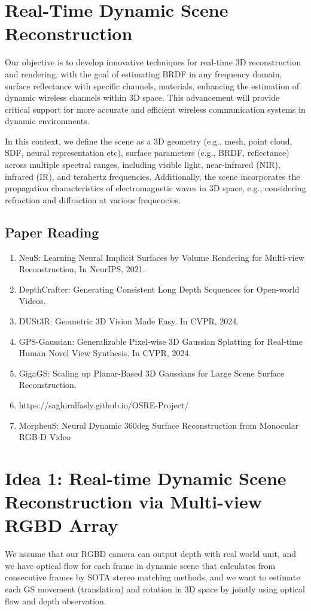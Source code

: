 \section{Real-Time Dynamic Scene Reconstruction}
Our objective is to develop innovative techniques for real-time 3D reconstruction and rendering, with the goal of estimating BRDF in any frequency domain, surface reflectance with specific channels, materials, enhancing the estimation of dynamic wireless channels within 3D space. This advancement will provide critical support for more accurate and efficient wireless communication systems in dynamic environments. 

In this context, we define the scene as a 3D geometry (e.g., mesh, point cloud, SDF, neural representation etc), surface parameters (e.g., BRDF, reflectance) across multiple spectral ranges, including visible light, near-infrared (NIR), infrared (IR), and terahertz frequencies. Additionally, the scene incorporates the propagation characteristics of electromagnetic waves in 3D space, e.g., considering refraction and diffraction at various frequencies.

\subsection{Paper Reading}
\begin{enumerate}
	\item NeuS: Learning Neural Implicit Surfaces by Volume Rendering for Multi-view Reconstruction, In NeurIPS, 2021. 
	\item DepthCrafter: Generating Consistent Long Depth Sequences
	for Open-world Videos.
	\item DUSt3R: Geometric 3D Vision Made Easy. In CVPR, 2024.
	\item GPS-Gaussian: Generalizable Pixel-wise 3D Gaussian Splatting for Real-time Human Novel View Synthesis. In CVPR, 2024.
	\item GigaGS: Scaling up Planar-Based 3D Gaussians for Large Scene Surface Reconstruction. 
	\item https://saghiralfasly.github.io/OSRE-Project/
	\item MorpheuS: Neural Dynamic 360deg Surface Reconstruction from Monocular RGB-D Video
\end{enumerate}


\section{Idea 1: Real-time Dynamic Scene Reconstruction via Multi-view RGBD Array}
We assume that our RGBD camera can output depth with real world unit, and we have optical flow for each frame in dynamic scene that calculates from consecutive frames by SOTA stereo matching methods, and we want to estimate each GS movement (translation) and rotation in 3D space by jointly using optical flow and depth observation.
  
